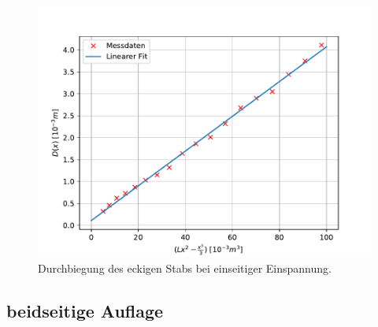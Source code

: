 \begin{figure}[!htb]
  \centering
  \includegraphics[scale=0.75]{content/plots/ecke.pdf}
  \caption{Durchbiegung des eckigen Stabs bei einseitiger Einspannung.}
  \label{fig:LinRegecke}
\end{figure}



\subsection{beidseitige Auflage}
\label{subsec:beidAuf}

